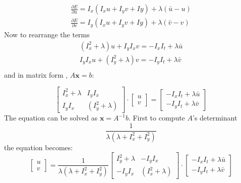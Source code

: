 \begin{equation} 
\begin{split} 
\frac{\partial E}{\partial u} = I_x(I_xu+I_yv+Iy) + \lambda(\bar{u}-u) \\
\frac{\partial E}{\partial v} = I_y(I_xu+I_yv+Iy) + \lambda(\bar{v}-v)
\end{split}
\end{equation}
Now to rearrange the  terms
\begin{equation} 
\begin{split} 
(I_x^2+\lambda)u + I_y I_x v  =  -I_xI_t + \lambda \bar{u} \\
I_y I_x u+(I_y^2+\lambda)v  = -I_yI_t + \lambda \bar{v} \\
\end{split}
\end{equation}
and in matrix form , $A \boldsymbol{x} = b$:

\begin{equation}
	\begin{bmatrix}
	I_x^2+\lambda & I_y I_x \\
	I_y I_x & (I_y^2+\lambda)
	\end{bmatrix}
	\cdot
	\begin{bmatrix}
	u \\
	v
	\end{bmatrix}
	=
		\begin{bmatrix}
	-I_xI_t + \lambda \bar{u}\\
	-I_yI_t + \lambda \bar{v}
		\end{bmatrix}
\end{equation}
The equation can be solved as $\boldsymbol{x} = A^{-1}b $. First to compute 
$A$'s determinant
\begin{equation}
	\frac{1}{\lambda(\lambda+I_x^2 + I_y^2)}
\end{equation}
the equation becomes:
\begin{equation}
\begin{bmatrix}
u \\
v
\end{bmatrix}
=
\frac{1}{\lambda(\lambda+I_x^2 + I_y^2)}
\begin{bmatrix}
I_y^2+\lambda & -I_y I_x \\
-I_y I_x & (I_x^2+\lambda)
\end{bmatrix}
\cdot
\begin{bmatrix}
-I_xI_t + \lambda \bar{u}\\
-I_yI_t + \lambda \bar{v}
\end{bmatrix}
\end{equation}

